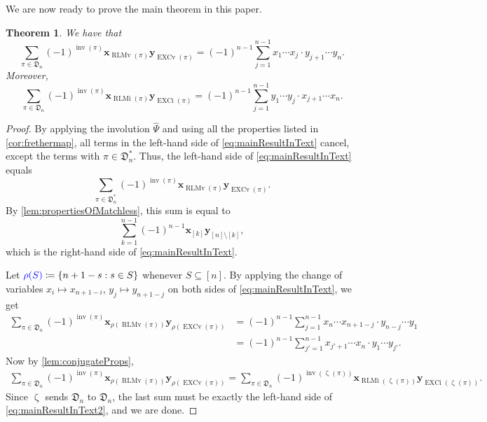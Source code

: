 \documentclass[reqno]{amsart}
\newtheorem{theorem}{Theorem}
\theoremstyle{definition}
\newcommand{\defin}[1]{%
\relax\ifmmode%
\textcolor{blue}{#1}%
\else\textcolor{blue}{\emph{#1}}%
\fi%
}
\newcommand{\xvec}{\mathbf{x}}
\newcommand{\yvec}{\mathbf{y}}
\newcommand{\dArr}{\mathfrak{D}}
\newcommand{\frether}{\hat{\Psi}}
\DeclareMathOperator{\inv}{inv}
\DeclareMathOperator{\EXCi}{EXCi}
\DeclareMathOperator{\EXCv}{EXCv}
\DeclareMathOperator{\RLMv}{RLMv}
\DeclareMathOperator{\RLMi}{RLMi}
\DeclareMathOperator{\zetaMap}{\zeta}
\begin{document}
We are now ready to prove the main theorem in this paper.
\begin{theorem}\label{thm:theMainTheorem}
 We have that 
 \begin{equation}\label{eq:mainResultInText}
 \sum_{\pi \in \dArr_n} (-1)^{\inv(\pi)} 
 \xvec_{\RLMv(\pi)} \yvec_{ \EXCv(\pi)} 
 =
 (-1)^{n-1} \sum_{j=1}^{n-1} x_1 \dotsm x_j \cdot y_{j+1}\dotsm y_{n}.
 \end{equation} 
Moreover, 
 \begin{equation}\label{eq:mainResultInText2}
 \sum_{\pi \in \dArr_n} (-1)^{\inv(\pi)} 
 \xvec_{\RLMi(\pi)} 
 \yvec_{\EXCi(\pi)}
 =
 (-1)^{n-1} \sum_{j=1}^{n-1} y_1 \dotsm y_j \cdot x_{j+1}\dotsm x_{n}.
 \end{equation} 
\end{theorem}
\begin{proof}
By applying the involution $\frether$ and 
using all the properties listed in \cref{cor:frethermap},
all terms in the left-hand side of \eqref{eq:mainResultInText} cancel, except the terms with $\pi \in \dArr^*_n$. Thus, the left-hand side of \eqref{eq:mainResultInText} equals
\begin{equation*}
\sum_{\pi\in  \dArr^*_n }
	(-1)^{\inv(\pi)} \xvec_{\RLMv(\pi)} \yvec_{\EXCv(\pi)}. 
\end{equation*}	
By \cref{lem:propertiesOfMatchless}, this sum is equal to
\begin{equation*}
\sum_{k=1}^{n-1}
(-1)^{n-1} \xvec_{[k]} \yvec_{[n] \setminus [k]},
\end{equation*}
which is the right-hand side of \eqref{eq:mainResultInText}.
\medskip

Let $\defin{\rho(S)}\coloneqq \{n+1-s : s\in S\}$ whenever $S\subseteq [n]$.
By applying the change of variables
$x_i \mapsto x_{n+1-i}$, $y_j \mapsto y_{n+1-j}$ on both sides of 
\eqref{eq:mainResultInText}, we get
\begin{align*}
 \sum_{\pi \in \dArr_n} (-1)^{\inv(\pi)} 
 \xvec_{\rho(\RLMv(\pi))}
  \yvec_{\rho(\EXCv(\pi))}
&= (-1)^{n-1} \sum_{j=1}^{n-1} x_n \dotsm x_{n+1-j} \cdot y_{n-j}\dotsm y_{1} \\
&= (-1)^{n-1} \sum_{j'=1}^{n-1} x_{j'+1} \dotsm x_{n} \cdot y_{1}\dotsm y_{j'}.
\end{align*}
%
Now by \cref{lem:conjugateProps},
\begin{align*}
\sum_{\pi \in \dArr_n} (-1)^{\inv(\pi)} 
\xvec_{\rho(\RLMv(\pi))}
\yvec_{\rho(\EXCv(\pi))}
\!
=
\!
\sum_{\pi \in \dArr_n} (-1)^{\inv(\zetaMap(\pi))} 
\xvec_{\RLMi(\zetaMap(\pi))}
\yvec_{\EXCi(\zetaMap(\pi))}.
\end{align*}
Since $\zetaMap$ sends $\dArr_n$ to $\dArr_n$, 
the last sum must be exactly the left-hand side of \eqref{eq:mainResultInText2}, and we are done.
\end{proof}
\end{document}
